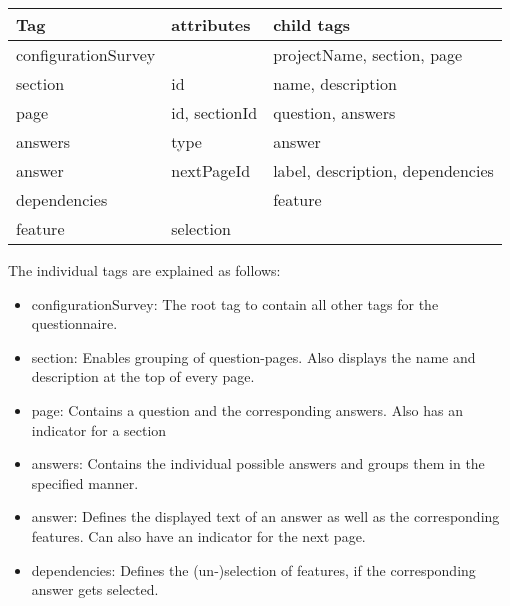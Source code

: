 \begin{tabulary}{\linewidth}{LLL}
\textbf{Tag} & \textbf{attributes} & \textbf{child tags}\\
\hline
configurationSurvey & & projectName, section, page\\
section & id & name, description\\
page & id, sectionId & question, answers\\
answers & type & answer\\
answer & nextPageId & label, description, dependencies\\
dependencies & & feature\\
feature & selection & \\
\end{tabulary}\vspace{2.5em}

The individual tags are explained as follows:

\begin{itemize}
\item configurationSurvey: The root tag to contain all other tags for the questionnaire.
\item section: Enables grouping of question-pages. Also displays the name and description at the top of every page.
\item page: Contains a question and the corresponding answers. Also has an indicator for a section
\item answers: Contains the individual possible answers and groups them in the specified manner.
\item answer: Defines the displayed text of an answer as well as the corresponding features. Can also have an indicator for the next page.
\item dependencies: Defines the (un-)selection of features, if the corresponding answer gets selected.
\end{itemize}

